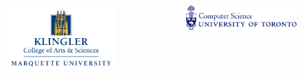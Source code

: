 \documentclass{beamer}
\begin{document}
\begin{frame}[fragile]
\begin{columns}[T]
\begin{column}{.135\textwidth}
\begin{figure}
\begin{center}
\includegraphics[width=1\linewidth]{img/MU_logo.jpg}
\end{center}
\end{figure}
\end{column}

\begin{column}{.135\textwidth}
\begin{figure}
\begin{center}
\vspace{1.25cm}
\includegraphics[width=1.3\linewidth]{img/CompSci_655.jpg}
\end{center}
\end{figure}
\end{column}


\end{columns}
\end{frame}
\end{document}
